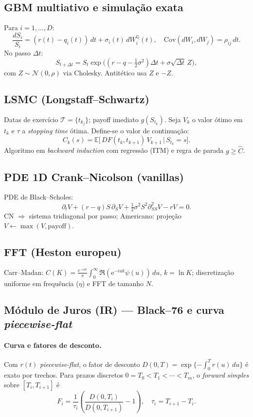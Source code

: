 \documentclass[11pt,a4paper]{article}
\begin{document}
\subsection{GBM multiativo e simulação exata}
Para $i=1,\dots,D$:
\[
\frac{dS_i}{S_i}=(r(t)-q_i(t))\,dt+\sigma_i(t)\,dW_i^{\mathbb Q}(t),\quad
\mathrm{Cov}(dW_i,dW_j)=\rho_{ij}\,dt.
\]
No passo $\Delta t$:
\[
S_{t+\Delta t} = S_t\exp\!\Big((r-q-\tfrac12\sigma^2)\Delta t + \sigma\sqrt{\Delta t}\,Z\Big),
\]
com $Z\sim \mathcal N(0,\rho)$ via Cholesky. Antitético usa $Z$ e $-Z$.

\subsection{LSMC (Longstaff--Schwartz)}
Datas de exercício $\mathcal T=\{t_{k_j}\}$; payoff imediato $g(S_{t_k})$.
Seja $V_k$ o valor ótimo em $t_k$ e $\tau$ a \emph{stopping time} ótima.
Define-se o valor de continuação:
\[
C_k(s)=\mathbb E\!\big[\,DF(t_k,t_{k+1})\,V_{k+1}\,\big|\,S_{t_k}=s\big].
\]
Algoritmo em \emph{backward induction} com regressão (ITM) e regra de parada $g \ge \widehat C$.

\subsection{PDE 1D Crank--Nicolson (vanillas)}
PDE de Black--Scholes:
\[
\partial_t V + (r-q)S\,\partial_S V + \tfrac12\sigma^2 S^2 \partial^2_{SS}V - rV = 0.
\]
CN $\Rightarrow$ sistema tridiagonal por passo; Americano: projeção $V\gets\max(V,\text{payoff})$.

\subsection{FFT (Heston europeu)}
Carr--Madan: $C(K)=\frac{e^{-\alpha k}}{\pi}\int_0^\infty \Re(\mathrm{e}^{-iuk}\psi(u))\,du$, $k=\ln K$;
discretização uniforme em frequência ($\eta$) e FFT de tamanho $N$.

\subsection{Módulo de Juros (IR) --- Black--76 e curva \emph{piecewise-flat}}
\paragraph{Curva e fatores de desconto.}
Com $r(t)$ \emph{piecewise-flat}, o fator de desconto $D(0,T)=\exp\{-\int_0^T r(u)\,du\}$ é exato por trechos. Para
prazos discretos $0=T_0<T_1<\cdots<T_m$, o \emph{forward simples} sobre $[T_i,T_{i+1}]$ é
\[
F_i = \frac{1}{\tau_i}\left(\frac{D(0,T_i)}{D(0,T_{i+1})} - 1\right), \quad \tau_i=T_{i+1}-T_i.
\]
\end{document}
